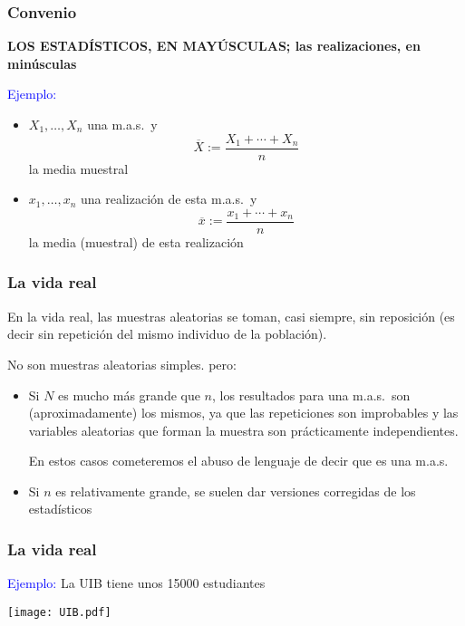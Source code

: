 \documentclass[12pt,t]{beamer}\usepackage[]{graphicx}\usepackage[]{color}
\newcommand{\blue}[1]{\textcolor{blue}{#1}}
\renewcommand{\emph}[1]{{\color{red}#1}}
\theoremstyle{plain}
\theoremstyle{definition}
\begin{document}
\begin{frame}
\frametitle{Convenio}

\emph{\bf LOS ESTADÍSTICOS, EN MAYÚSCULAS; las realizaciones, en minúsculas}
\medskip

\blue{Ejemplo:} 
\begin{itemize}
\item $X_1,\ldots,X_n$ una m.a.s.\ y 
$$
\overline{X}:=\frac{X_1+\cdots+X_n}{n}
$$
la media muestral\medskip


\item $x_1,\ldots,x_n$ una realización  de esta  m.a.s.\ y 
$$
\overline{x}:=\frac{x_1+\cdots+x_n}{n}
$$
la media (muestral) de esta realización
\end{itemize}

\end{frame}




\begin{frame}
\frametitle{La vida real}

En la vida real, las muestras aleatorias se toman, casi siempre, sin reposición (es decir sin repetición del mismo individuo de la población).

No son muestras aleatorias simples. pero:
\begin{itemize}
\item Si $N$ es mucho más grande que $n$,  los resultados para una   m.a.s.\ son  (aproximadamente) los mismos,  ya que las  repeticiones son improbables y las variables aleatorias que forman la muestra son prácticamente  independientes.
\smallskip

En estos casos cometeremos el abuso de lenguaje  de decir que es una m.a.s.

\medskip

\item Si $n$ es relativamente grande, se suelen dar  versiones corregidas de los estadísticos
\end{itemize}

\end{frame}


\begin{frame}
\frametitle{La vida real}

\blue{Ejemplo:} La UIB tiene unos 15000 estudiantes





\begin{center}
\texttt{[image: UIB.pdf]}
\end{center}

\end{frame}
\end{document}
